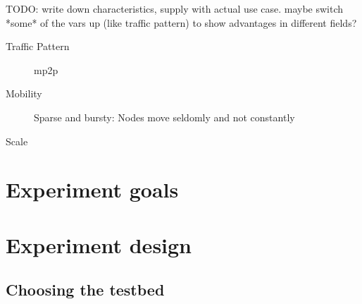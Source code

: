 \documentclass{acm_proc_article-sp}
\begin{document}
TODO: write down characteristics, supply with actual use case. maybe switch *some* of the vars up (like traffic pattern) to show advantages in different fields?

\begin{description}
\item[Traffic Pattern] mp2p
\item[Mobility] Sparse and bursty: Nodes move seldomly and not constantly
\item[Scale]
\end{description}


\section{Experiment goals}
\label{sec:Goals}

\section{Experiment design}
\label{sec:Design}

\subsection{Choosing the testbed}
\label{subsec:testbed_choice}
\end{document}
